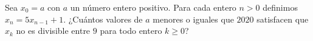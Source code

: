 Sea $x_0 = a$ con $a$ un número entero positivo. Para cada entero $n \gt 0$ definimos $x_n = 5x_{n-1} + 1$. ¿Cuántos valores de $a$ menores o iguales que $2020$ satisfacen que $x_k$ no es divisible entre $9$ para todo entero $k \geq 0$?
